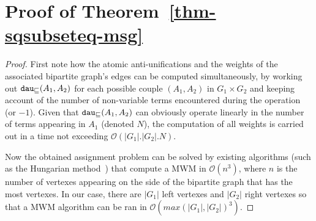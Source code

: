 %	
	
	
	\section{Proof of Theorem~\ref{thm-sqsubseteq-msg}}
\begin{proof}
	First note how the atomic anti-unifications and the weights of the associated bipartite graph's edges can be computed simultaneously, by working out $\texttt{dau}_\sqsubseteq(A_1,A_2)$ for each possible couple $(A_1,A_2)$ in $G_1\times G_2$ and keeping account of the number of non-variable terms encountered during the operation (or $-1$). Given that $\texttt{dau}_\sqsubseteq(A_1,A_2)$ can obviously operate linearly in the number of terms appearing in $A_1$ (denoted $N$), the computation of all weights is carried out in a time not exceeding $\mathcal{O}(|G_1|.|G_2|.N)$.
	
	Now the obtained assignment problem can be solved by existing algorithms (such as the Hungarian method~\cite{assignment}) that compute a MWM in $\mathcal{O}(n^3)$, where $n$ is the number of vertexes appearing on the side of the bipartite graph that has the most vertexes. In our case, there are $|G_1|$ left vertexes and $|G_2|$ right vertexes so that a MWM algorithm can be ran in $\mathcal{O}(max(|G_1|,|G_2|)^3)$.
\end{proof}
	
